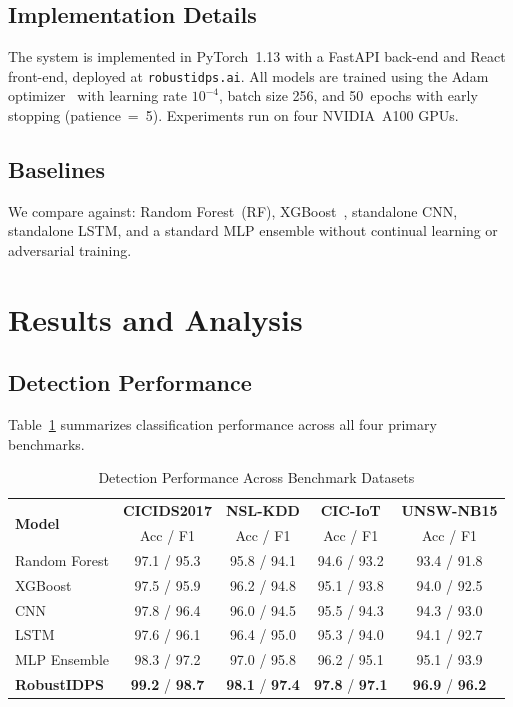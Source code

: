 \subsection{Implementation Details}
The system is implemented in PyTorch~1.13 with a FastAPI back-end and React front-end, deployed at \texttt{robustidps.ai}. All models are trained using the Adam optimizer~\cite{Kingma2015} with learning rate $10^{-4}$, batch size 256, and 50~epochs with early stopping (patience~=~5). Experiments run on four NVIDIA~A100 GPUs.

\subsection{Baselines}
We compare against: Random Forest~(RF), XGBoost~\cite{Chen2016}, standalone CNN, standalone LSTM, and a standard MLP ensemble without continual learning or adversarial training.

\section{Results and Analysis}
\label{sec:results}

\subsection{Detection Performance}

Table~\ref{tab:detection} summarizes classification performance across all four primary benchmarks.

\begin{table}[!t]
\centering
\caption{Detection Performance Across Benchmark Datasets}
\label{tab:detection}
\renewcommand{\arraystretch}{1.15}
\begin{tabular}{@{}lcccc@{}}
\toprule
\multirow{2}{*}{\textbf{Model}} & \textbf{CICIDS2017} & \textbf{NSL-KDD} & \textbf{CIC-IoT} & \textbf{UNSW-NB15} \\
 & Acc / F1 & Acc / F1 & Acc / F1 & Acc / F1 \\
\midrule
Random Forest   & 97.1 / 95.3 & 95.8 / 94.1 & 94.6 / 93.2 & 93.4 / 91.8 \\
XGBoost         & 97.5 / 95.9 & 96.2 / 94.8 & 95.1 / 93.8 & 94.0 / 92.5 \\
CNN             & 97.8 / 96.4 & 96.0 / 94.5 & 95.5 / 94.3 & 94.3 / 93.0 \\
LSTM            & 97.6 / 96.1 & 96.4 / 95.0 & 95.3 / 94.0 & 94.1 / 92.7 \\
MLP Ensemble    & 98.3 / 97.2 & 97.0 / 95.8 & 96.2 / 95.1 & 95.1 / 93.9 \\
\midrule
\textbf{RobustIDPS} & \textbf{99.2} / \textbf{98.7} & \textbf{98.1} / \textbf{97.4} & \textbf{97.8} / \textbf{97.1} & \textbf{96.9} / \textbf{96.2} \\
\bottomrule
\end{tabular}
\end{table}

